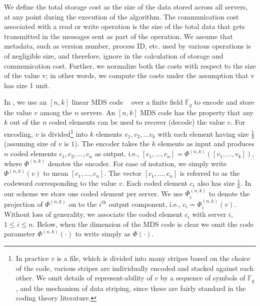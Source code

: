 We define the total storage cost as the size of the
data stored across all servers, at any point during the execution of the algorithm. The
communication cost associated with a read or write operation is the size of the total data that
gets transmitted in the messages sent as part of the operation. We assume that metadata,
such as version number, process ID, etc. used by various operations is of negligible size, and therefore,  ignore in the calculation of storage and communication cost. Further, we normalize
both the costs with respect to the size of the value v; in other words, we compute the costs
under the assumption that v has size 1 unit.

  In \treasmod{}, we use an $[n, k]$  linear MDS code ~\cite{verapless_book} over a finite field $\mathbb{F}_q$ to encode and store the value $v$ among the $n$ servers. An $[n, k]$ MDS code has the property that any $k$ out of the $n$ coded elements can be used to recover (decode) the value $v$. 
 For encoding, $v$ is divided\footnote{In practice $v$ is a file, which is divided into many stripes based on the choice of the code, various stripes are individually encoded and stacked against each other. We omit details of represent-ability of $v$ by a sequence of symbols of $\mathbb{F}_q$, and the mechanism of data striping, since these are fairly standard in the coding theory literature.} into $k$ elements $v_1, v_2, \ldots v_k$ with each element having  size $\frac{1}{k}$ (assuming size of $v$ is $1$). The encoder takes the $k$ elements as input and produces $n$ coded elements $c_1, c_2, \ldots, c_n$ as output, i.e., $[c_1, \ldots, c_n] = \Phi^{(n,k)}([v_1, \ldots, v_k])$, where $\Phi^{(n, k)}$ denotes the encoder. For ease of notation, we simply write $\Phi^{(n, k)}(v)$ to mean  $[c_1, \ldots, c_n]$. The vector $[c_1, \ldots, c_n]$ is  referred to as the codeword corresponding to the value $v$. Each coded element $c_i$ also has  size $\frac{1}{k}$. In our scheme we store one coded element per server. We use $\Phi^{(n, k)}_i$ to denote the projection of $\Phi^{(n, k)}$ on to the $i^{\text{th}}$ output component, i.e., $c_i = \Phi^{(n, k)}_i(v)$. Without loss of generality, we associate the coded element $c_i$ with server $i$, $1 \leq i \leq n$.  Below, when the dimension of the MDS code is clear we omit the code parameter $\Phi^{(n, k)}(\cdot)$ to write simply as $\Phi(\cdot)$. 
 
